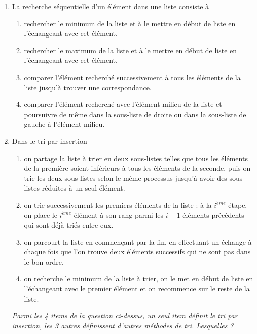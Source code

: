\begin{td}[QCM (4)]
\begin{enumerate}
\item La recherche séquentielle d'un élément dans une liste consiste à 
	\begin{enumerate}
	\item rechercher le minimum de la liste et à le mettre en début de liste 
		en l'échangeant avec cet élément.
	\item rechercher le maximum de la liste et à le mettre en début de liste 
		en l'échangeant avec cet élément.
	\item comparer l'élément recherché successivement à tous les 
		éléments de la liste jusqu'à trouver une correspondance.
	\item comparer l'élément recherché avec l'élément milieu de la liste
		et poursuivre de même dans la sous-liste de droite ou 
		dans la sous-liste de gauche à l'élément milieu.
	\end{enumerate}

\item Dans le tri par insertion 
	\begin{enumerate}
	\item on partage la liste à trier en deux sous-listes telles que tous les éléments 
		de la première soient inférieurs à tous les éléments de la seconde,
		puis on trie les deux sous-listes selon le même processus jusqu'à 
		avoir des sous-listes réduites à un seul élément.
	\item on trie successivement les premiers éléments de la liste : à la $i^{\grave eme}$ étape, 
		on place le $i^{\grave eme}$ élément à son rang 
		parmi les $i-1$ éléments précédents qui sont déjà triés entre eux.
	\item on parcourt la liste en commençant par la fin, en effectuant un échange à
		chaque fois que l'on trouve deux éléments successifs qui ne sont pas 
		dans le bon ordre.
	\item on recherche le minimum de la liste à trier, on le met en début de liste 
		en l'échangeant avec le premier élément et on recommence sur le reste de la liste.
	\end{enumerate}

	{\em Parmi les 4 items de la question ci-dessus, un seul item définit le
tri par insertion, les 3 autres définissent d'autres méthodes de tri. Lesquelles ?}

\end{enumerate}
\end{td}

